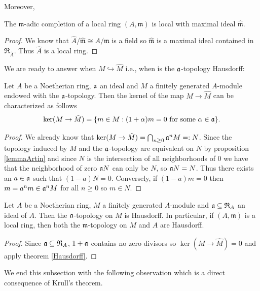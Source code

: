 Moreover,
\begin{coro}
    The $\mathfrak m$-adic completion of a local ring $(A,\mathfrak m)$ is local with maximal ideal $\hat{\mathfrak m}$.
\end{coro}
\begin{proof}
    We know that $\hat A/\hat{\mathfrak m}\cong A/\mathfrak m$ is a field so $\hat{\mathfrak m}$ is a maximal ideal contained in $\mathfrak R_{\hat A}$. Thus $\hat A$ is a local ring.
\end{proof}

We are ready to answer when $M\hookrightarrow\hat M$ i.e., when is the $\mathfrak{a}$-topology Hausdorff:
\begin{thm}\label{krull}
    Let $A$ be a Noetherian ring, $\mathfrak{a}$ an ideal and $M$ a finitely generated $A$-module endowed with the $\mathfrak{a}$-topology. Then the kernel of the map $M\to \hat M$ can be characterized as follows
    \[
    \ker(M\to\hat M)=\{m\in M : (1+\alpha)m=0 \text{ for some }\alpha\in\mathfrak{a}\}.
    \]
\end{thm}
\begin{proof}
    We already know that $\ker(M\to\hat M)=\bigcap_{n\geq 0}\mathfrak{a}^nM=: N$. Since the topology induced by $M$ and the $\mathfrak{a}$-topology are equivalent on $N$ by proposition \ref{lemmaArtin} and since $N$ is the intersection of all neighborhoods of $0$ we have that the neighborhood of zero $\mathfrak{a} N$ can only be $N$, so $\mathfrak{a} N=N$. Thus  there exists an $a\in\mathfrak{a}$ such that $(1-a)N=0$. Conversely, if $(1-a)m=0$ then $m=a^nm\in\mathfrak{a}^nM$ for all $n\geq 0$ so $m\in N$.
\end{proof}

\begin{coro}
    Let $A$ be a Noetherian ring, $M$ a finitely generated $A$-module and $\mathfrak{a}\subseteq \mathfrak R_A$ an ideal of $A$. Then the $\mathfrak{a}$-topology on $M$ is Hausdorff. In particular, if $(A, \mathfrak m)$ is a local ring, then both the $\mathfrak m$-topology on $M$ and $A$ are Hausdorff.
\end{coro}
\begin{proof}
    Since $\mathfrak{a}\subseteq\mathfrak R_A$, $1+\mathfrak{a}$ contains no zero divisors so $\ker(M\to \hat M)=0$ and apply theorem \ref{Hausdorff}.
\end{proof}

We end this subsection with the following observation which is a direct consequence of Krull's theorem.

